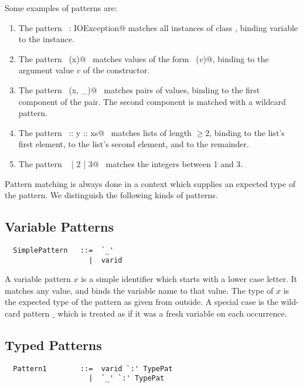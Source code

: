 \example Some examples of patterns are:
\begin{enumerate}
\item
The pattern ~\lstinline@ex: IOException@ matches all instances of class
\lstinline@IOException@, binding variable \verb@ex@ to the instance.
\item
The pattern ~\lstinline@Some(x)@~ matches values of the form ~\lstinline@Some($v$)@,
binding \lstinline@x@ to the argument value $v$ of the  constructor.
\item
The pattern ~\lstinline@(x, _)@~ matches pairs of values, binding \lstinline@x@ to
the first component of the pair. The second component is matched
with a wildcard pattern.
\item
The pattern ~\lstinline@x :: y :: xs@~ matches lists of length $\geq 2$,
binding \lstinline@x@ to the list's first element, \lstinline@y@ to the list's
second element, and \lstinline@xs@ to the remainder.
\item
The pattern ~ | 2 | 3@~ matches the integers between 1 and 3.
\end{enumerate}

Pattern matching is always done in a context which supplies an
expected type of the pattern. We distinguish the following kinds of
patterns.

\subsection{Variable Patterns}

\syntax\begin{lstlisting}
  SimplePattern   ::=  `_'
                    |  varid
\end{lstlisting}

A variable pattern $x$ is a simple identifier which starts with a
lower case letter.  It matches any value, and binds the variable name
to that value.  The type of $x$ is the expected type of the pattern as
given from outside.  A special case is the wild-card pattern $\_$
which is treated as if it was a fresh variable on each occurrence.

\subsection{Typed Patterns}
\label{sec:typed-patterns}
\syntax
\begin{lstlisting}
  Pattern1        ::=  varid `:' TypePat
                    |  `_' `:' TypePat
\end{lstlisting}

